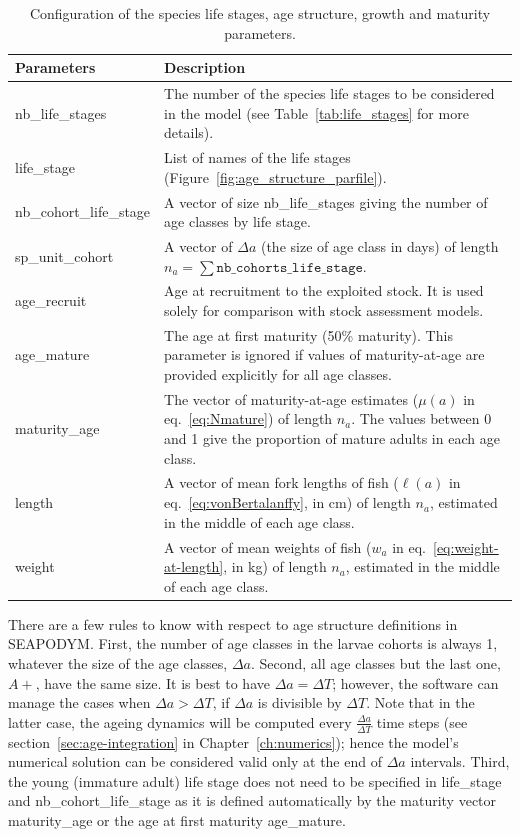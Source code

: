 \begin{table}[H]
\caption{Configuration of the species life stages, age structure, growth and maturity parameters.}
\begin{tabular}{p{4.25cm}p{11.25cm}}
    \hline
    {\bfseries Parameters} & {\bfseries Description}\\ \hline\hline
    {\ttfamily nb\_life\_stages} & The number of the species life stages to be considered in the model (see Table~\ref{tab:life_stages} for more details). \\
    {\ttfamily life\_stage} & List of names of the life stages (Figure~\ref{fig:age_structure_parfile}). \\
    {\ttfamily nb\_cohort\_life\_stage} &  A vector of size {\ttfamily nb\_life\_stages} giving the number of age classes by life stage.  \\\hline
    {\ttfamily sp\_unit\_cohort} & A vector of $\Delta a$ (the size of age class in days) of length $n_a=\sum{\texttt{nb\_cohorts\_life\_stage}}$. \\\hline
    {\ttfamily age\_recruit} & Age at recruitment to the exploited stock. It is used solely for comparison with stock assessment models.\\    
    {\ttfamily age\_mature} & The age at first maturity (50\% maturity). This parameter is ignored if values of maturity-at-age are provided explicitly for all age classes. \\
    {\ttfamily maturity\_age} & The vector of maturity-at-age estimates ($\mu(a)$ in eq.~\ref{eq:Nmature}) of length $n_a$. The values between 0 and 1 give the proportion of mature adults in each age class. \\\hline    
    {\ttfamily length} & A vector of mean fork lengths of fish ($\ell(a)$ in eq.~\ref{eq:vonBertalanffy}, in cm) of length $n_{a}$, estimated in the middle of each age class. \\
    {\ttfamily weight} & A vector of mean weights of fish ($w_a$ in eq.~\ref{eq:weight-at-length}, in kg) of length $n_{a}$, estimated in the middle of each age class.\\
    \hline
\end{tabular}
\label{tab:model_age_structure}
\end{table}

There are a few rules to know with respect to age structure definitions in SEAPODYM. First, the number of age classes in the larvae cohorts is always 1, whatever the size of the age classes, $\Delta a$. Second, all age classes but the last one, $A+$, have the same size. It is best to have $\Delta a = \Delta T$; however, the software can manage the cases when $\Delta a > \Delta T$, if $\Delta a$ is divisible by $\Delta T$. Note that in the latter case, the ageing dynamics will be computed every $\frac{\Delta a}{\Delta T}$ time steps (see section~\ref{sec:age-integration} in Chapter~\ref{ch:numerics}); hence the model's numerical solution can be considered valid only at the end of $\Delta a$ intervals. Third, the young (immature adult) life stage does not need to be specified in {\ttfamily life\_stage} and {\ttfamily nb\_cohort\_life\_stage} as it is defined automatically by the maturity vector {\ttfamily maturity\_age} or the age at first maturity {\ttfamily age\_mature}. 


